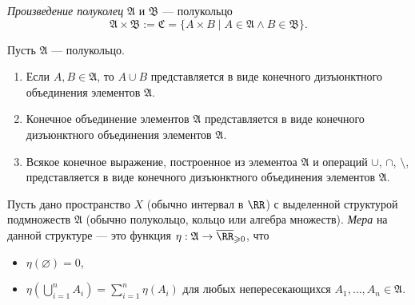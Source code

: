 \documentclass[12pt,a4paper]{article}
\begin{document}
    \begin{definition}
        \emph{Произведение полуколец} $\mathfrak{A}$ и $\mathfrak{B}$ --- полукольцо
        \[\mathfrak{A} \times \mathfrak{B} := \mathfrak{C} = \{A \times B \mid A \in \mathfrak{A} \wedge B \in \mathfrak{B}\}.\]
    \end{definition}

    \begin{lemma}
        Пусть $\mathfrak{A}$ --- полукольцо.
        \begin{enumerate}
            \item Если $A, B \in \mathfrak{A}$, то $A \cup B$ представляется в виде конечного дизъюнктного объединения элементов $\mathfrak{A}$.
            \item Конечное объединение элементов $\mathfrak{A}$ представляется в виде конечного дизъюнктного объединения элементов $\mathfrak{A}$.
            \item Всякое конечное выражение, построенное из элементоа $\mathfrak{A}$ и операций $\cup$, $\cap$, $\setminus$, представляется в виде конечного дизъюнктного объединения элементов $\mathfrak{A}$.
        \end{enumerate}
    \end{lemma}

    \begin{definition}
        Пусть дано пространство $X$ (обычно интервал в $\RR$) с выделенной структурой подмножеств $\mathfrak{A}$ (обычно полукольцо, кольцо или алгебра множеств). \emph{Мера} на данной структуре --- это функция $\eta: \mathfrak{A} \to \overline{\RR}_{\geqslant 0}$, что
        \begin{itemize}
            \item $\eta(\varnothing) = 0$,
            \item $\eta\left(\bigcup_{i=1}^n A_i\right) = \sum_{i=1}^n \eta(A_i)$ для любых непересекающихся $A_1, \dots, A_n \in \mathfrak{A}$.
        \end{itemize}
    \end{definition}
\end{document}
